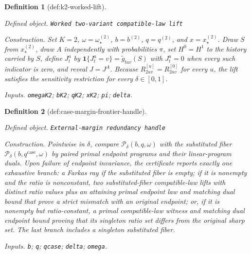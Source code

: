 \documentclass{article}
\newtheorem{definition}{Definition}
\begin{document}
\begin{definition}[def:k2-worked-lift]\label{def:k2-worked-lift}
\par\smallskip\noindent\emph{Defined object.} \texttt{Worked two-\allowbreak{}variant compatible-\allowbreak{}law lift}
\par\smallskip\noindent\emph{Construction.} Set \(K=2\), \(\omega=\omega_\star^{(2)}\), \(b=b^{(2)}\), \(q=q^{(2)}\), and \(x=x_\star^{(2)}\). Draw \(S\) from \(x_\star^{(2)}\), draw \(A\) independently with probabilities \(\pi\), set \(H^0=H^1\) to the history carried by \(S\), define \(J_t^a\) by \(\mathbf 1\{J_t^a=v\}=\widetilde g_{tav}(S)\) with \(J_t^a=0\) when every such indicator is zero, and reveal \(J=J^A\). Because \(R^{[u]}_{2av}=R^{[0]}_{2av}\) for every \(u\), the lift satisfies the sensitivity restriction for every \(\delta\in[0,1]\).
\par\smallskip\noindent\emph{Inputs.} \texttt{omegaK2}; \texttt{bK2}; \texttt{qK2}; \texttt{xK2}; \texttt{pi}; \texttt{delta}.
\end{definition}

\begin{definition}[def:case-margin-frontier-handle]\label{def:case-margin-frontier-handle}
\par\smallskip\noindent\emph{Defined object.} \texttt{External-\allowbreak{}margin redundancy handle}
\par\smallskip\noindent\emph{Construction.} Pointwise in \(\delta\), compare \(\mathcal P_\delta(b,q,\omega)\) with the substituted fiber \(\mathcal P_\delta(b,q^{\mathrm{case}},\omega)\) by paired primal endpoint programs and their linear-program duals. Upon failure of endpoint invariance, the certificate reports exactly one exhaustive branch: a Farkas ray if the substituted fiber is empty; if it is nonempty and the ratio is nonconstant, two substituted-fiber compatible-law lifts with distinct ratio values plus an attaining primal endpoint law and matching dual bound that prove a strict mismatch with an original endpoint; or, if it is nonempty but ratio-constant, a primal compatible-law witness and matching dual endpoint bound proving that its singleton ratio set differs from the original sharp set. The last branch includes a singleton substituted fiber.
\par\smallskip\noindent\emph{Inputs.} \texttt{b}; \texttt{q}; \texttt{qcase}; \texttt{delta}; \texttt{omega}.
\end{definition}
\end{document}
